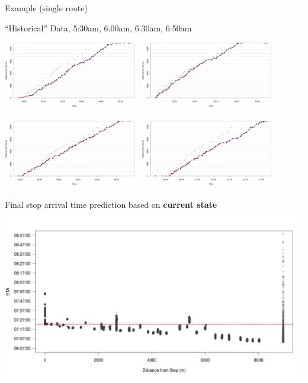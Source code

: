 \documentclass[10pt,t]{beamer}
\begin{document}
\begin{frame}{Example (single route)}
\begin{overprint}
    \vspace{2em}
    ``Historical'' Data, 5:30am, 6:00am, 6.30am, 6:50am
    \centering
    \includegraphics[width=0.45\textwidth]{figs/r274/TRIP1_distance_traveled.png}
    \includegraphics[width=0.45\textwidth]{figs/r274/TRIP2_distance_traveled.png}\\
    \includegraphics[width=0.45\textwidth]{figs/r274/TRIP3_distance_traveled.png}
    \includegraphics[width=0.45\textwidth]{figs/r274/TRIP4_distance_traveled.png}

    \vspace{2em}
    Final stop arrival time prediction based on \textbf{current state}
    \centering
    \includegraphics[width=1\textwidth]{figs/r274/TRIP5_arrival_last_state.png}


\end{overprint}
\end{frame}
\end{document}
